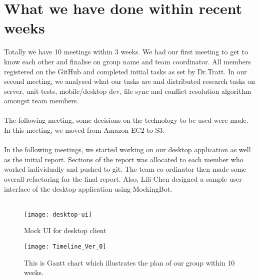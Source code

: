 \section{What we have done within recent weeks}

Totally we have 10 meetings within 3 weeks. We had our first meeting to get to know each other and finalise on group name and team coordinator. All members registered on the GitHub and completed initial tasks as set by Dr.Tratt. In our second meeting, we analysed what our tasks are and distributed research tasks on server, unit tests, mobile/desktop dev, file sync and conflict resolution algorithm amongst team members. \\\\
The following meeting, some decisions on the technology to be used were made. In this meeting, we moved from Amazon EC2 to S3. \\\\
In the following meetings, we started working on our desktop application as well as the initial report. Sections of the report was allocated to each member who worked individually and pushed to git. The team co-ordinator then made some overall refactoring for the final report. Also, Lili Chen designed a sample user interface of the desktop application using MockingBot. \\\

\begin{figure}[H]
\centering
\texttt{[image: desktop-ui]}
\caption{Mock UI for desktop client}
\end{figure}

\begin{sidewaysfigure}
\centering
\texttt{[image: Timeline\_Ver\_0]}
\caption{This is Gantt chart which illustrates the plan of our group within 10 weeks.}
\end{sidewaysfigure}\newpage
